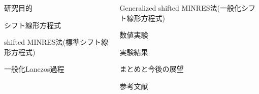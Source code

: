 \documentclass[final, dvipdfmx]{beamer}
\begin{document}
\begin{frame}[t]{}
	
	\vspace{-\baselineskip}
	\begin{columns}[T]
	\begin{column}{.49\linewidth}
		\begin{block}{研究目的}
			\vspace{0.2\baselineskip}
			
		\end{block}
		\begin{block}{シフト線形方程式}
			\vspace{0.2\baselineskip}
			
		\end{block}
		\begin{block}{shifted MINRES法{\normalsize (標準シフト線形方程式)}}
			\vspace{0.2\baselineskip}
			
		\end{block}
		\begin{block}{一般化Lanczos過程}
			\vspace{0.2\baselineskip}
			
		\end{block}
	\end{column}
	\hspace{0.0\columnwidth}
	\begin{column}{.49\linewidth}
		\begin{block}{Generalized shifted MINRES法{\normalsize (一般化シフト線形方程式)}}
			\vspace{0.2\baselineskip}
			
		\end{block}
		\begin{block}{数値実験}
			\vspace{0.2\baselineskip}
			
		\end{block}
		\begin{block}{実験結果}
			\vspace{0.2\baselineskip}
			
		\end{block}
		\begin{block}{まとめと今後の展望}
			\vspace{0.2\baselineskip}
			
		\end{block}
		\begin{block}{参考文献}
			
		\end{block}
	\end{column}
	\end{columns}
	\vspace{0.4\baselineskip}
\end{frame}
\end{document}
